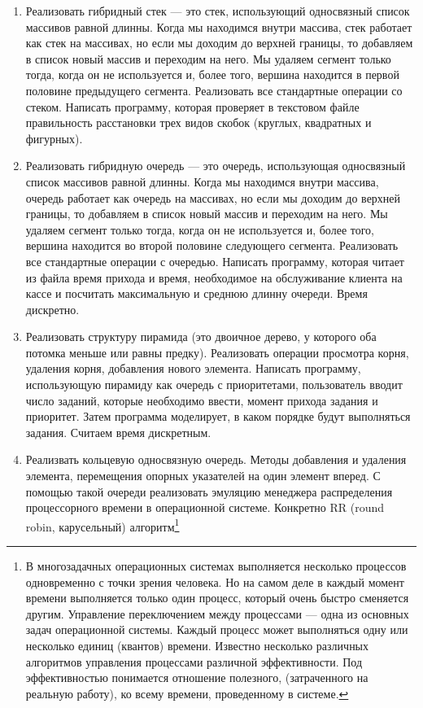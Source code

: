 \documentclass[12pt]{article}
\begin{document}
\begin{enumerate}
 \item Реализовать гибридный стек --- это стек, использующий односвязный список массивов равной длинны. Когда мы 
 находимся внутри массива, стек работает как стек на массивах, но если мы доходим до верхней границы, то добавляем 
 в список новый массив и переходим на него. Мы удаляем сегмент только тогда, когда он не используется и, более того,
 вершина находится в первой половине предыдущего сегмента. Реализовать все стандартные операции со стеком. 
 Написать программу, которая проверяет в текстовом файле  правильность расстановки трех видов скобок (круглых, 
 квадратных и фигурных).
 \item Реализовать гибридную очередь  --- это очередь, использующая односвязный список массивов равной длинны. Когда мы 
 находимся внутри массива, очередь работает как  очередь на массивах,  но если мы доходим до верхней границы, то 
 добавляем в список новый массив и переходим на него. Мы удаляем сегмент только тогда, когда он не используется и, 
 более того, вершина находится во второй половине следующего сегмента. Реализовать все стандартные операции с очередью. 
 Написать программу, которая читает из файла время прихода и время, необходимое на обслуживание клиента на кассе и 
 посчитать максимальную и среднюю длинну очереди. Время дискретно.
 \item Реализовать структуру пирамида (это двоичное дерево, у которого оба потомка меньше или равны предку). 
 Реализовать операции просмотра корня, удаления корня, добавления нового элемента. Написать программу, использующую 
 пирамиду как очередь с приоритетами, пользователь вводит число заданий, которые необходимо ввести, момент прихода
 задания и приоритет. Затем программа моделирует, в каком порядке будут выполняться задания. Считаем время дискретным.
 \item Реализвать кольцевую односвязную очередь. Методы добавления  и удаления элемента, перемещения опорных указателей 
 на один элемент вперед. С помощью такой очереди реализовать эмуляцию менеджера распределения процессорного времени 
 в операционной системе. Конкретно RR (round robin, карусельный) алгоритм\footnote{В многозадачных операционных системах
 выполняется несколько процессов одновременно с точки зрения человека. Но на самом деле в каждый момент времени 
 выполняется только один процесс, который очень быстро сменяется другим. Управление переключением между 
 процессами --- одна из основных задач операционной системы. Каждый процесс может выполняться одну или несколько единиц 
 (квантов) времени. Известно несколько различных алгоритмов управления процессами различной эффективности. 
 Под эффективностью понимается отношение полезного, (затраченного на реальную работу), ко всему времени, проведенному 
 в системе. 
 
}
\end{enumerate}
\end{document}
